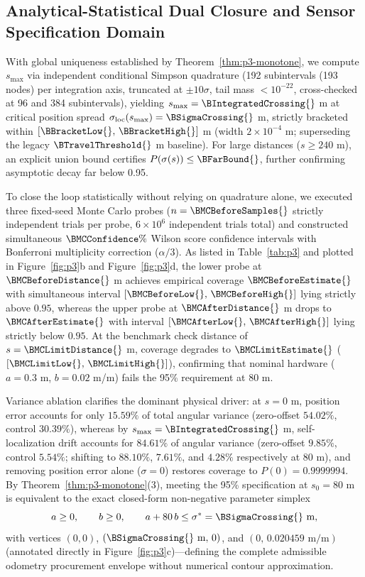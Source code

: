 \subsection{Analytical-Statistical Dual Closure and Sensor Specification Domain}
With global uniqueness established by Theorem~\ref{thm:p3-monotone}, we compute $s_{\max}$ via independent conditional Simpson quadrature (192 subintervals (193 nodes) per integration axis, truncated at $\pm 10\sigma$, tail mass $<10^{-22}$, cross-checked at 96 and 384 subintervals), yielding $s_{\max}=\BIntegratedCrossing{}$ m at critical position spread $\sigma_{\mathrm{loc}}(s_{\max})=\BSigmaCrossing{}$ m, strictly bracketed within $[\BBracketLow{},\,\BBracketHigh{}]$ m (width $2\times 10^{-4}$ m; superseding the legacy $\BTravelThreshold{}$ m baseline). For large distances ($s\ge 240$ m), an explicit union bound certifies $P(\sigma(s))\le \BFarBound{}$, further confirming asymptotic decay far below 0.95.

To close the loop statistically without relying on quadrature alone, we executed three fixed-seed Monte Carlo probes ($n=\BMCBeforeSamples{}$ strictly independent trials per probe, $6\times 10^6$ independent trials total) and constructed simultaneous $\BMCConfidence\%$ Wilson score confidence intervals \cite{wilson1927,brown2001} with Bonferroni multiplicity correction ($\alpha/3$). As listed in Table~\ref{tab:p3} and plotted in Figure~\ref{fig:p3}b and Figure~\ref{fig:p3}d, the lower probe at $\BMCBeforeDistance{}$ m achieves empirical coverage $\BMCBeforeEstimate{}$ with simultaneous interval $[\BMCBeforeLow{},\,\BMCBeforeHigh{}]$ lying strictly above $0.95$, whereas the upper probe at $\BMCAfterDistance{}$ m drops to $\BMCAfterEstimate{}$ with interval $[\BMCAfterLow{},\,\BMCAfterHigh{}]$ lying strictly below $0.95$. At the benchmark check distance of $s=\BMCLimitDistance{}$ m, coverage degrades to $\BMCLimitEstimate{}$ ($[\BMCLimitLow{},\,\BMCLimitHigh{}]$), confirming that nominal hardware ($a=0.3$ m, $b=0.02$ m/m) fails the 95\% requirement at 80 m.

Variance ablation clarifies the dominant physical driver: at $s=0$ m, position error accounts for only $15.59\%$ of total angular variance (zero-offset $54.02\%$, control $30.39\%$), whereas by $s_{\max}=\BIntegratedCrossing{}$ m, self-localization drift accounts for $84.61\%$ of angular variance (zero-offset $9.85\%$, control $5.54\%$; shifting to $88.10\%$, $7.61\%$, and $4.28\%$ respectively at 80 m), and removing position error alone ($\sigma=0$) restores coverage to $P(0)=0.9999994$. By Theorem~\ref{thm:p3-monotone}(3), meeting the 95\% specification at $s_0=80$ m is equivalent to the exact closed-form non-negative parameter simplex
\[
a \ge 0,\qquad b \ge 0,\qquad a + 80\,b \le \sigma^* = \BSigmaCrossing{}\text{ m},
\]
with vertices $(0,0)$, $(\BSigmaCrossing{}\text{ m},\,0)$, and $(0,\,0.020459\text{ m/m})$ (annotated directly in Figure~\ref{fig:p3}c)—defining the complete admissible odometry procurement envelope without numerical contour approximation.
